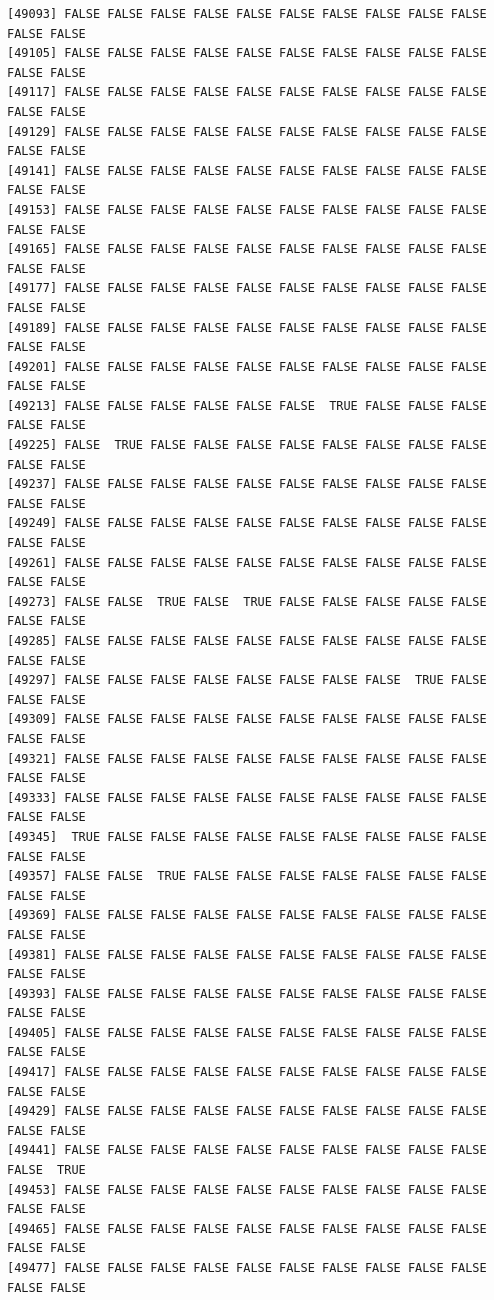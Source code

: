 \documentclass[
  a4paper,
  DIV=11,
  numbers=noendperiod]{scrartcl}
\begin{document}
\begin{verbatim}
[49093] FALSE FALSE FALSE FALSE FALSE FALSE FALSE FALSE FALSE FALSE FALSE FALSE
[49105] FALSE FALSE FALSE FALSE FALSE FALSE FALSE FALSE FALSE FALSE FALSE FALSE
[49117] FALSE FALSE FALSE FALSE FALSE FALSE FALSE FALSE FALSE FALSE FALSE FALSE
[49129] FALSE FALSE FALSE FALSE FALSE FALSE FALSE FALSE FALSE FALSE FALSE FALSE
[49141] FALSE FALSE FALSE FALSE FALSE FALSE FALSE FALSE FALSE FALSE FALSE FALSE
[49153] FALSE FALSE FALSE FALSE FALSE FALSE FALSE FALSE FALSE FALSE FALSE FALSE
[49165] FALSE FALSE FALSE FALSE FALSE FALSE FALSE FALSE FALSE FALSE FALSE FALSE
[49177] FALSE FALSE FALSE FALSE FALSE FALSE FALSE FALSE FALSE FALSE FALSE FALSE
[49189] FALSE FALSE FALSE FALSE FALSE FALSE FALSE FALSE FALSE FALSE FALSE FALSE
[49201] FALSE FALSE FALSE FALSE FALSE FALSE FALSE FALSE FALSE FALSE FALSE FALSE
[49213] FALSE FALSE FALSE FALSE FALSE FALSE  TRUE FALSE FALSE FALSE FALSE FALSE
[49225] FALSE  TRUE FALSE FALSE FALSE FALSE FALSE FALSE FALSE FALSE FALSE FALSE
[49237] FALSE FALSE FALSE FALSE FALSE FALSE FALSE FALSE FALSE FALSE FALSE FALSE
[49249] FALSE FALSE FALSE FALSE FALSE FALSE FALSE FALSE FALSE FALSE FALSE FALSE
[49261] FALSE FALSE FALSE FALSE FALSE FALSE FALSE FALSE FALSE FALSE FALSE FALSE
[49273] FALSE FALSE  TRUE FALSE  TRUE FALSE FALSE FALSE FALSE FALSE FALSE FALSE
[49285] FALSE FALSE FALSE FALSE FALSE FALSE FALSE FALSE FALSE FALSE FALSE FALSE
[49297] FALSE FALSE FALSE FALSE FALSE FALSE FALSE FALSE  TRUE FALSE FALSE FALSE
[49309] FALSE FALSE FALSE FALSE FALSE FALSE FALSE FALSE FALSE FALSE FALSE FALSE
[49321] FALSE FALSE FALSE FALSE FALSE FALSE FALSE FALSE FALSE FALSE FALSE FALSE
[49333] FALSE FALSE FALSE FALSE FALSE FALSE FALSE FALSE FALSE FALSE FALSE FALSE
[49345]  TRUE FALSE FALSE FALSE FALSE FALSE FALSE FALSE FALSE FALSE FALSE FALSE
[49357] FALSE FALSE  TRUE FALSE FALSE FALSE FALSE FALSE FALSE FALSE FALSE FALSE
[49369] FALSE FALSE FALSE FALSE FALSE FALSE FALSE FALSE FALSE FALSE FALSE FALSE
[49381] FALSE FALSE FALSE FALSE FALSE FALSE FALSE FALSE FALSE FALSE FALSE FALSE
[49393] FALSE FALSE FALSE FALSE FALSE FALSE FALSE FALSE FALSE FALSE FALSE FALSE
[49405] FALSE FALSE FALSE FALSE FALSE FALSE FALSE FALSE FALSE FALSE FALSE FALSE
[49417] FALSE FALSE FALSE FALSE FALSE FALSE FALSE FALSE FALSE FALSE FALSE FALSE
[49429] FALSE FALSE FALSE FALSE FALSE FALSE FALSE FALSE FALSE FALSE FALSE FALSE
[49441] FALSE FALSE FALSE FALSE FALSE FALSE FALSE FALSE FALSE FALSE FALSE  TRUE
[49453] FALSE FALSE FALSE FALSE FALSE FALSE FALSE FALSE FALSE FALSE FALSE FALSE
[49465] FALSE FALSE FALSE FALSE FALSE FALSE FALSE FALSE FALSE FALSE FALSE FALSE
[49477] FALSE FALSE FALSE FALSE FALSE FALSE FALSE FALSE FALSE FALSE FALSE FALSE

\end{verbatim}
\end{document}
